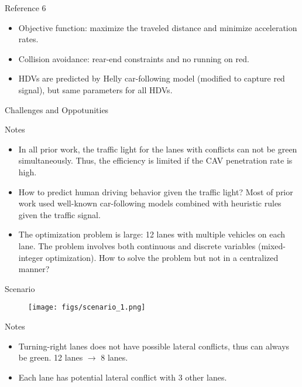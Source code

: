 \documentclass[9pt]{beamer}
\begin{document}
\begin{frame}{Reference 6}
\cite{tajalli2021traffic}

\begin{block}{}
\begin{itemize}
\item Objective function: maximize the traveled distance and minimize acceleration rates.
\item Collision avoidance: rear-end constraints and no running on red.
\item HDVs are predicted by Helly car-following model (modified to capture red signal), but same parameters for all HDVs.
\end{itemize}

\end{block}
\end{frame}


\begin{frame}{Challenges and Oppotunities}
\begin{block}{Notes}

\begin{itemize}
\item In all prior work, the traffic light for the lanes with conflicts can not be green simultaneously. Thus, the efficiency is limited if the CAV penetration rate is high.

\item How to predict human driving behavior given the traffic light? Most of prior work used well-known car-following models combined with heuristic rules given the traffic signal.

\item The optimization problem is large: 12 lanes with multiple vehicles on each lane.
The problem involves both continuous and discrete variables (mixed-integer optimization).
How to solve the problem but not in a centralized manner?

\end{itemize}
	
\end{block}
\end{frame}

\begin{frame}{Scenario}
\begin{figure}
\centering
\texttt{[image: figs/scenario\_1.png]}
\end{figure}

\begin{block}{Notes}
\begin{itemize}
\item Turning-right lanes does not have possible lateral conflicts, thus can always be green. 12 lanes $\rightarrow$ 8 lanes.
\item Each lane has potential lateral conflict with 3 other lanes.
\end{itemize}
\end{block}
\end{frame}
\end{document}
